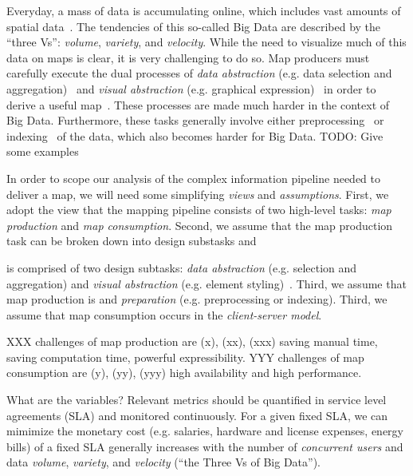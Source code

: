 \documentclass[11pt, oneside]{report}   	%
\begin{document}
Everyday, a mass of data is accumulating online, which includes vast amounts of spatial data~\cite{agrawal2012bigdata}. The tendencies of this so-called Big Data are described by the ``three Vs'': \emph{volume}, \emph{variety}, and \emph{velocity}. While the need to visualize much of this data on maps is clear, it is very challenging to do so. Map producers must carefully execute the dual processes of \emph{data abstraction} (e.g. data selection and aggregation)~\cite{haunert2006landcover,schmid2013opensciencemap} and \emph{visual abstraction} (e.g. graphical expression)~\cite{jacques1967semiologie} in order to derive a useful map~\cite{stolte2003multiscale,weibel1999generalising}. These processes are made much harder in the context of Big Data. Furthermore, these tasks generally involve either preprocessing~\cite{sarma2012fusiontables,kefaloukos2014declarative} or indexing~\cite{bereuter2013real,nutanong2012multiresolution} of the data, which also becomes harder for Big Data. TODO: Give some examples



In order to scope our analysis of the complex information pipeline needed to deliver a map, we will need some simplifying \emph{views} and \emph{assumptions}. First, we adopt the view that the mapping pipeline consists of two high-level tasks: \emph{map production} and \emph{map consumption}. Second, we assume that the map production task can be broken down into design substasks  and 

is comprised of two design subtasks: \emph{data abstraction} (e.g. selection and aggregation) and \emph{visual abstraction} (e.g. element styling)~\cite{stolte2003multiscale,jacques1967semiologie}. Third, we assume that map production is  and \emph{preparation} (e.g. preprocessing or indexing). Third, we assume that map consumption occurs in the \emph{client-server model}.

XXX challenges of map production are (x), (xx), (xxx) saving manual time, saving computation time, powerful expressibility. YYY challenges of map consumption are (y), (yy), (yyy) high availability and high performance.

What are the variables? Relevant metrics should be quantified in service level agreements (SLA) and monitored continuously. For a given fixed SLA, we can mimimize the monetary cost (e.g. salaries, hardware and license expenses, energy bills) of a fixed SLA generally increases with the number of \emph{concurrent users} and data \emph{volume}, \emph{variety}, and \emph{velocity} (``the Three Vs of Big Data'').
\end{document}
